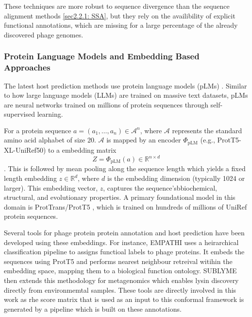 \vspace{0.15cm}
\noindent These techniques are more robust to sequence divergence than the sequence alignment methods \ref{sec2.2.1: SSA}, but they rely on the availibility of explicit functional
annotations, which are missing for a large percentage of the already discovered phage genomes.


\subsubsection{Protein Language Models and Embedding Based Approaches}
\label{sec2.2.3: PLMs}
\noindent The latest host prediction methods use protein language models (pLMs) \cite{elnaggar2022prottrans, flamholz2024large}.
Similar to how large language models (LLMs) are trained on massive text datasets, pLMs are neural networks trained on 
millions of protein sequences through self-supervised learning.

\vspace{0.15cm}
\noindent For a protein sequence $a = (a_1, \dots, a_n) \in \mathcal{A}^n$, where $\mathcal{A}$ represents the standard
amino acid alphabet of size 20. $\mathcal{A}$ is mapped by an encoder $\Phi_{\text{pLM}}$ (e.g., ProtT5-XL-UniRef50)
\cite{elnaggar2022prottrans} to a embedding matrix $$Z = \Phi_{\text{pLM}}(a) \in \mathbb{R}^{n \times d}$$. This is followed
by mean pooling along the sequence length which yields a fixed length embedding $z \in \mathbb{R}^d$, where $d$ is the embedding 
dimension (typically 1024 or larger). This embedding vector, $z$, captures the sequence'sbbiochemical, structural, and 
evolutionary properties. A primary foundational model in this domain is ProtTrans/ProtT5 \cite{elnaggar2022prottrans}, 
which is trained on hundreds of millions of UniRef protein sequences.

\vspace{0.15cm}
\noindent Several tools for phage protein protein annotation and host prediction have been developed using these embeddings.
For instance, EMPATHI \cite{boulay2025empathi} uses a heirarchical classification pipeline to assigns functioal labels 
to phage proteins. It embeds the sequences using ProtT5 and performs nearest neighbour retreival witihin the embedding space,
mapping them to a biological function ontology. SUBLYME \cite{boulay2026phalp} then extends this methodology for metagenomics
which enables lysin discovery directly from environmemtal samples. These tools are directly involved in this work as rhe 
score matrix that is used as an input to this conformal framework is generated by a pipeline which is built on these annotations.

